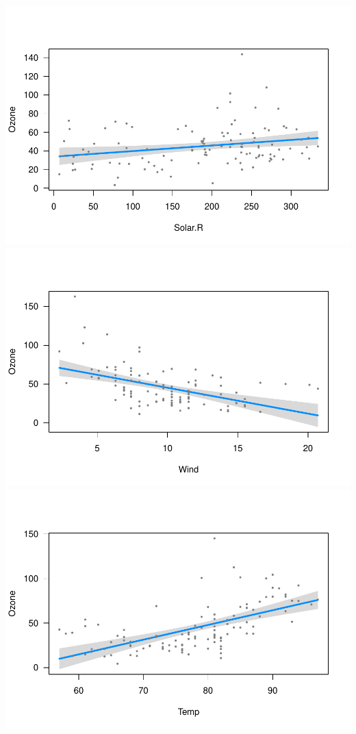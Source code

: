 \documentclass[]{article}
\begin{document}
\includegraphics{Intro_Datenanalyse1_files/figure-latex/unnamed-chunk-278-1.pdf}
\includegraphics{Intro_Datenanalyse1_files/figure-latex/unnamed-chunk-278-2.pdf}
\includegraphics{Intro_Datenanalyse1_files/figure-latex/unnamed-chunk-278-3.pdf}
\end{document}

